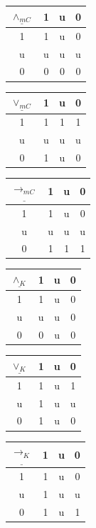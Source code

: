 \documentclass[10pt,a4paper]{article}
\theoremstyle{definition}
\newcommand{\3}{\vspace{.3in}}
\newcommand{\2}{\vspace{.2in}}
\newcommand{\1}{\vspace{.1in}}
\newcommand{\5}{\vspace{.05in}}
\begin{document}
\begin{center}
	\begin{tabular}{|c|ccc|}
		\hline
		$\underline{\wedge_{mC}} $ & 1 & u & 0 \\
		\hline
		1 & 1 & u & 0 \\
		u & u & u & u \\
		0 & 0 & 0 & 0 \\
		\hline
	\end{tabular}
	\begin{tabular}{|c|ccc|}
		\hline$\underline{\vee_{mC}} $ & 1 & u & 0 \\\hline
		1 & 1 & 1 & 1 \\
		u & u & u & u \\
		0 & 1 & u & 0 \\\hline
	\end{tabular}
	\begin{tabular}{|c|ccc|}
		\hline
		$\underline{\rightarrow_{mC}} $ & 1 & u & 0 \\
		\hline
		1 & 1 & u & 0 \\
		u & u & u & u \\
		0 & 1 & 1 & 1 \\
		\hline
	\end{tabular}
	\end{center} 
	\begin{center}
	\begin{tabular}{|c|ccc|}
		\hline
		$\underline{\wedge_K} $ & 1 & u & 0 \\
		\hline
		1 & 1 & u & 0 \\
		u & u & u & 0 \\
		0 & 0 & u & 0 \\
		\hline
	\end{tabular}
	\begin{tabular}{|c|ccc|}
		\hline$\underline{\vee_K} $ & 1 & u & 0 \\\hline
		1 & 1 & u & 1 \\
		u & 1 & u & u \\
		0 & 1 & u & 0 \\\hline
	\end{tabular}
	\begin{tabular}{|c|ccc|}
		\hline
		$\underline{\rightarrow_K} $ & 1 & u & 0 \\
		\hline
		1 & 1 & u & 0 \\
		u & 1 & u & u \\
		0 & 1 & u & 1 \\
		\hline
	\end{tabular}
\end{center} 
\end{document}
